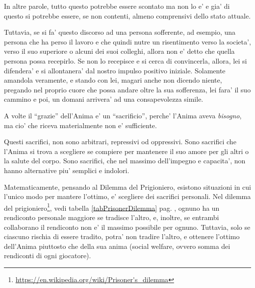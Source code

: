In altre parole, tutto questo potrebbe essere scontato ma non lo e' e gia' di questo si potrebbe essere, se non contenti, almeno comprensivi dello stato attuale.

Tuttavia, se si fa' questo discorso ad una persona sofferente, ad esempio, una persona che ha perso il lavoro e che quindi nutre un risentimento verso la societa', verso il suo superiore o alcuni dei suoi colleghi, allora non e' detto che quella persona possa recepirlo. Se non lo recepisce e si cerca di convincerla, allora, lei si difendera' e si allontanera' dal nostro impulso positivo iniziale. Solamente amandola veramente, e stando con lei, magari anche non dicendo niente, pregando nel proprio cuore che possa andare oltre la sua sofferenza, lei fara' il suo cammino e poi, un domani arrivera' ad una consapevolezza simile.

A volte il ``grazie'' dell'Anima e' un ``sacrificio'', perche' l'Anima aveva \emph{bisogno}, ma cio' che riceva materialmente non e' sufficiente.

Questi sacrifici, non sono arbitrari, repressivi od oppressivi. Sono sacrifici che l'Anima si trova a scegliere se compiere per mantenere il suo amore per gli altri o la salute del corpo. Sono sacrifici, che nel massimo dell'impegno e capacita', non hanno alternative piu' semplici e indolori.

Matematicamente, pensando al Dilemma del Prigioniero, esistono situazioni in cui l'unico modo per mantere l'ottimo, e' scegliere dei sacrifici personali. Nel dilemma del prigioniero\footnote{\url{https://en.wikipedia.org/wiki/Prisoner's\_dilemma}}, vedi tabella \ref{tabPrisonerDilemma} pag. \pageref{tabPrisonerDilemma}, ognuno ha un rendiconto personale maggiore se tradisce l'altro, e, inoltre, se entrambi collaborano il rendiconto non e' il massimo possibile per ognuno. Tuttavia, solo se ciascuno rischia di essere tradito, potra' non tradire l'altro, e ottenere l'ottimo dell'Anima piuttosto che della sua anima (social welfare, ovvero somma dei rendiconti di ogni giocatore).

